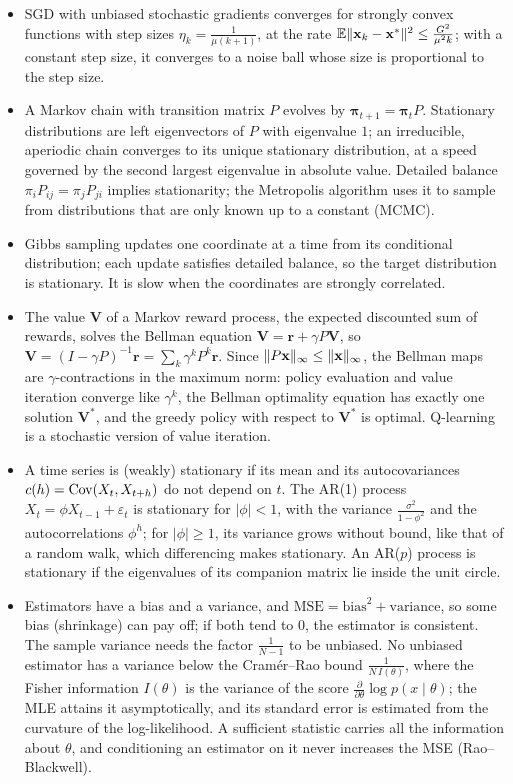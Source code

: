 \begin{itemize}[leftmargin=*]
    \item SGD with unbiased stochastic gradients converges for strongly convex functions with step sizes $\eta_k = \frac{1}{\mu(k + 1)}$, at the rate $\mathbb{E}\lVert \mathbf{x}_k - \mathbf{x}^* \rVert^2 \leq \frac{G^2}{\mu^2k}$; with a constant step size, it converges to a noise ball whose size is proportional to the step size.
    \item A Markov chain with transition matrix $P$ evolves by $\boldsymbol{\pi}_{t+1} = \boldsymbol{\pi}_t P$. Stationary distributions are left eigenvectors of $P$ with eigenvalue $1$; an irreducible, aperiodic chain converges to its unique stationary distribution, at a speed governed by the second largest eigenvalue in absolute value. Detailed balance $\pi_i P_{ij} = \pi_j P_{ji}$ implies stationarity; the Metropolis algorithm uses it to sample from distributions that are only known up to a constant (MCMC).
    \item Gibbs sampling updates one coordinate at a time from its conditional distribution; each update satisfies detailed balance, so the target distribution is stationary. It is slow when the coordinates are strongly correlated.
    \item The value $\mathbf{V}$ of a Markov reward process, the expected discounted sum of rewards, solves the Bellman equation $\mathbf{V} = \mathbf{r} + \gamma P\mathbf{V}$, so $\mathbf{V} = (I - \gamma P)^{-1}\mathbf{r} = \sum_k \gamma^kP^k\mathbf{r}$. Since $\lVert P\mathbf{x} \rVert_\infty \leq \lVert \mathbf{x} \rVert_\infty$, the Bellman maps are $\gamma$-contractions in the maximum norm: policy evaluation and value iteration converge like $\gamma^k$, the Bellman optimality equation has exactly one solution $\mathbf{V}^*$, and the greedy policy with respect to $\mathbf{V}^*$ is optimal. Q-learning is a stochastic version of value iteration.
    \item A time series is (weakly) stationary if its mean and its autocovariances $c(h) = \operatorname{Cov}(X_t, X_{t+h})$ do not depend on $t$. The AR(1) process $X_t = \phi X_{t-1} + \varepsilon_t$ is stationary for $|\phi| < 1$, with the variance $\frac{\sigma^2}{1 - \phi^2}$ and the autocorrelations $\phi^h$; for $|\phi| \geq 1$, its variance grows without bound, like that of a random walk, which differencing makes stationary. An AR($p$) process is stationary if the eigenvalues of its companion matrix lie inside the unit circle.
    \item Estimators have a bias and a variance, and $\mathrm{MSE} = \text{bias}^2 + \text{variance}$, so some bias (shrinkage) can pay off; if both tend to $0$, the estimator is consistent. The sample variance needs the factor $\frac{1}{N - 1}$ to be unbiased. No unbiased estimator has a variance below the Cram\'er--Rao bound $\frac{1}{N\,I(\theta)}$, where the Fisher information $I(\theta)$ is the variance of the score $\frac{\partial}{\partial\theta}\log p(x \mid \theta)$; the MLE attains it asymptotically, and its standard error is estimated from the curvature of the log-likelihood. A sufficient statistic carries all the information about $\theta$, and conditioning an estimator on it never increases the MSE (Rao--Blackwell).

\end{itemize}

